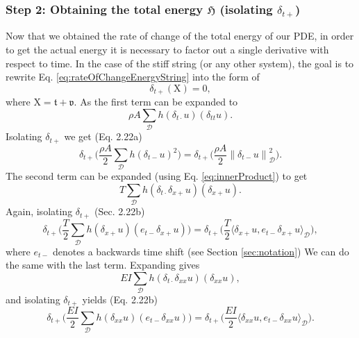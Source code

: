 \documentclass{article}
\begin{document}
\subsubsection*{Step 2: Obtaining the total energy $\mathfrak{H}$ (isolating $\delta_{t+}$)}
Now that we obtained the rate of change of the total energy of our PDE, in order to get the actual energy it is necessary to factor out a single derivative with respect to time.
 In the case of the stiff string (or any other system), the goal is to rewrite Eq. \eqref{eq:rateOfChangeEnergyString} into the form of
\begin{equation}\label{eq:forwardTimeForm}
    \delta_{t+}(\text{X}) = 0,
\end{equation}
where $\text{X}=\mathfrak{t} + \mathfrak{v}$.
As the first term can be expanded to
\begin{equation}
    \rho A\sum_\mathcal{D}h(\delta_{t\cdot}u)(\delta_{tt}u).
\end{equation}
Isolating $\delta_{t+}$ we get (Eq. 2.22a)
\begin{equation}
\delta_{t+}\Bigg(\frac{\rho A}{2}\sum_\mathcal{D}h(\delta_{t-}u)^2\Bigg) = \delta_{t+}\Bigg(\frac{\rho A}{2} \left\lVert\delta_{t-}u\right\rVert_\mathcal{D}^2\Bigg).
\end{equation}
The second term can be expanded (using Eq. \eqref{eq:innerProduct}) to get
\begin{equation}
    T \sum_{\mathcal{D}}h (\delta_{t\cdot}\delta_{x+}u)(\delta_{x+}u).
\end{equation}
Again, isolating $\delta_{t+}$ (Sec. 2.22b)
\begin{equation}
    \delta_{t+}\Bigg(\frac{T}{2}\sum_\mathcal{D}h (\delta_{x+}u)( e_{t-}\delta_{x+}u)\Bigg) = \delta_{t+}\Bigg(\frac{T}{2}\langle\delta_{x+}u, e_{t-}\delta_{x+}u\rangle_\mathcal{D}\Bigg),
\end{equation}
where $e_{t-}$ denotes a backwards time shift (see Section \ref{sec:notation})
We can do the same with the last term. Expanding gives
\begin{equation}
    EI \sum_{\mathcal{D}}h(\delta_{t\cdot}\delta_{xx}u)(\delta_{xx}u),
\end{equation}
and isolating $\delta_{t+}$ yields (Eq. 2.22b)
\begin{equation}
    \delta_{t+}\Bigg(\frac{EI}{2}\sum_\mathcal{D}h(\delta_{xx}u)(e_{t-}\delta_{xx}u)\Bigg) = \delta_{t+}\Bigg(\frac{EI}{2}\langle\delta_{xx}u,e_{t-}\delta_{xx}u\rangle_\mathcal{D}\Bigg).
\end{equation}
\end{document}
